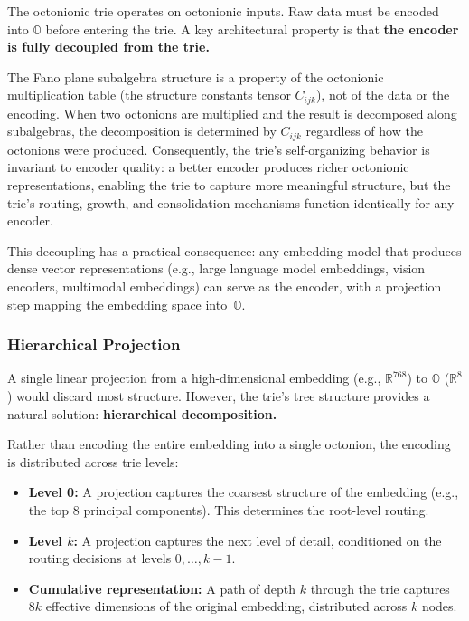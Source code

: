 \documentclass[11pt,a4paper]{article}
\theoremstyle{definition}
\theoremstyle{remark}
\newcommand{\Oct}{\mathbb{O}}
\newcommand{\Real}{\mathbb{R}}
\begin{document}
The octonionic trie operates on octonionic inputs. Raw data must be encoded into $\Oct$ before entering the trie. A key architectural property is that \textbf{the encoder is fully decoupled from the trie.}

The Fano plane subalgebra structure is a property of the octonionic multiplication table (the structure constants tensor $C_{ijk}$), not of the data or the encoding. When two octonions are multiplied and the result is decomposed along subalgebras, the decomposition is determined by $C_{ijk}$ regardless of how the octonions were produced. Consequently, the trie's self-organizing behavior is invariant to encoder quality: a better encoder produces richer octonionic representations, enabling the trie to capture more meaningful structure, but the trie's routing, growth, and consolidation mechanisms function identically for any encoder.

This decoupling has a practical consequence: any embedding model that produces dense vector representations (e.g., large language model embeddings, vision encoders, multimodal embeddings) can serve as the encoder, with a projection step mapping the embedding space into~$\Oct$.

\subsubsection{Hierarchical Projection}

A single linear projection from a high-dimensional embedding (e.g., $\Real^{768}$) to $\Oct$ ($\Real^8$) would discard most structure. However, the trie's tree structure provides a natural solution: \textbf{hierarchical decomposition.}

Rather than encoding the entire embedding into a single octonion, the encoding is distributed across trie levels:

\begin{itemize}[nosep]
  \item \textbf{Level 0:} A projection captures the coarsest structure of the embedding (e.g., the top 8 principal components). This determines the root-level routing.
  \item \textbf{Level $k$:} A projection captures the next level of detail, conditioned on the routing decisions at levels $0, \ldots, k-1$.
  \item \textbf{Cumulative representation:} A path of depth $k$ through the trie captures $8k$ effective dimensions of the original embedding, distributed across $k$ nodes.
\end{itemize}
\end{document}
